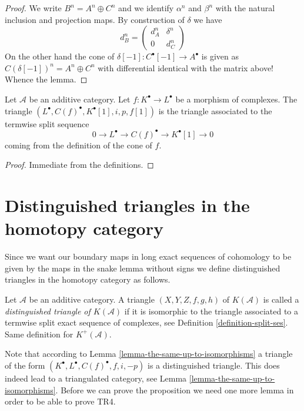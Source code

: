 \begin{proof}
We write $B^n = A^n \oplus C^n$ and we identify $\alpha^n$ and $\beta^n$
with the natural inclusion and projection maps. By construction of $\delta$ we
have
$$
d_B^n =
\left(
\begin{matrix}
d_A^n & \delta^n \\
0 & d_C^n
\end{matrix}
\right)
$$
On the other hand the cone of $\delta[-1] : C^\bullet[-1] \to A^\bullet$
is given as $C(\delta[-1])^n = A^n \oplus C^n$ with differential identical
with the matrix above! Whence the lemma.
\end{proof}

\begin{lemma}
\label{lemma-rotate-cone}
Let $\mathcal{A}$ be an additive category.
Let $f : K^\bullet \to L^\bullet$ be a morphism of complexes.
The triangle $(L^\bullet, C(f)^\bullet, K^\bullet[1], i, p, f[1])$ is
the triangle associated to the termwise split sequence
$$
0 \to L^\bullet \to C(f)^\bullet \to K^\bullet[1] \to 0
$$
coming from the definition of the cone of $f$.
\end{lemma}

\begin{proof}
Immediate from the definitions.
\end{proof}






\section{Distinguished triangles in the homotopy category}
\label{section-homotopy-triangulated}

\noindent
Since we want our boundary maps in long exact sequences of cohomology
to be given by the maps in the snake lemma without signs we define
distinguished triangles in the homotopy category as follows.

\begin{definition}
\label{definition-distinguished-triangle}
Let $\mathcal{A}$ be an additive category.
A triangle $(X, Y, Z, f, g, h)$ of $K(\mathcal{A})$ is
called a {\it distinguished triangle of $K(\mathcal{A})$}
if it is isomorphic to the triangle associated to
a termwise split exact sequence of complexes, see Definition
\ref{definition-split-ses}.
Same definition for $K^{+}(\mathcal{A})$.
\end{definition}

\noindent
Note that according to Lemma \ref{lemma-the-same-up-to-isomorphisms}
a triangle of the form $(K^\bullet, L^\bullet, C(f)^\bullet, f, i, -p)$
is a distinguished triangle.
This does indeed lead to a triangulated category, see
Lemma \ref{lemma-the-same-up-to-isomorphisms}.
Before we can prove the proposition we need one more lemma
in order to be able to prove TR4.

